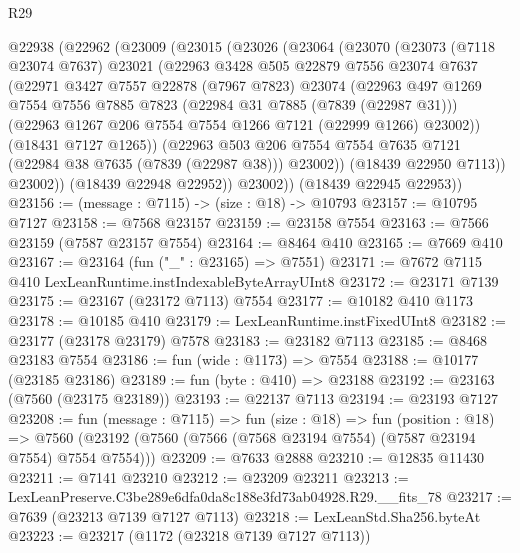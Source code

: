 \begin{lexlean}{R29}
\begin{coremodule}
  @22938
    (@22962
      (@23009
        (@23015
          (@23026
            (@23064
              (@23070
                (@23073
                  (@7118 @23074 @7637)
                  @23021
                  (@22963
                    @3428
                    @505
                    @22879
                    @7556
                    @23074
                    @7637
                    (@22971
                      @3427
                      @7557
                      @22878
                      (@7967 @7823)
                      @23074
                      (@22963
                        @497
                        @1269
                        @7554
                        @7556
                        @7885
                        @7823
                        (@22984 @31 @7885 (@7839 (@22987 @31)))
                        (@22963 @1267 @206 @7554 @7554 @1266 @7121 (@22999 @1266) @23002))
                      (@18431 @7127 @1265))
                    (@22963
                      @503
                      @206
                      @7554
                      @7554
                      @7635
                      @7121
                      (@22984 @38 @7635 (@7839 (@22987 @38)))
                      @23002))
                  (@18439 @22950 @7113))
                @23002))
            (@18439 @22948 @22952))
          @23002))
      (@18439 @22945 @22953))
@23156 := (message : @7115) -> (size : @18) -> @10793
@23157 := @10795 @7127
@23158 := @7568 @23157
@23159 := @23158 @7554
@23163 := @7566 @23159 (@7587 @23157 @7554)
@23164 := @8464 @410
@23165 := @7669 @410
@23167 := @23164 (fun ("_" : @23165) => @7551)
@23171 := @7672 @7115 @410 LexLeanRuntime.instIndexableByteArrayUInt8
@23172 := @23171 @7139
@23175 := @23167 (@23172 @7113) @7554
@23177 := @10182 @410 @1173
@23178 := @10185 @410
@23179 := LexLeanRuntime.instFixedUInt8
@23182 := @23177 (@23178 @23179) @7578
@23183 := @23182 @7113
@23185 := @8468 @23183 @7554
@23186 := fun (wide : @1173) => @7554
@23188 := @10177 (@23185 @23186)
@23189 := fun (byte : @410) => @23188
@23192 := @23163 (@7560 (@23175 @23189))
@23193 := @22137 @7113
@23194 := @23193 @7127
@23208 := fun (message : @7115) =>
  fun (size : @18) =>
  fun (position : @18) =>
  @7560 (@23192 (@7560 (@7566 (@7568 @23194 @7554) (@7587 @23194 @7554) @7554 @7554)))
@23209 := @7633 @2888
@23210 := @12835 @11430
@23211 := @7141 @23210
@23212 := @23209 @23211
@23213 := LexLeanPreserve.C3be289e6dfa0da8c188e3fd73ab04928.R29.__fits_78
@23217 := @7639 (@23213 @7139 @7127 @7113)
@23218 := LexLeanStd.Sha256.byteAt
@23223 := @23217 (@1172 (@23218 @7139 @7127 @7113))

\end{coremodule}
\end{lexlean}

